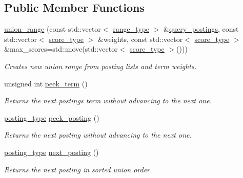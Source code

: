 \subsection*{Public Member Functions}
\begin{DoxyCompactItemize}
\item 
\mbox{\hyperlink{classirk_1_1union__range_a64113cb12f111b46248be984b3ca16c2}{union\+\_\+range}} (const std\+::vector$<$ \mbox{\hyperlink{classirk_1_1union__range_aae1621f1e73b1b78990ad11eaa52452b}{range\+\_\+type}} $>$ \&\mbox{\hyperlink{namespaceirk_af66b19416653b16808a23d66c715635a}{query\+\_\+postings}}, const std\+::vector$<$ \mbox{\hyperlink{classirk_1_1union__range_af728218b976df464ebb051a9e5358e93}{score\+\_\+type}} $>$ \&weights, const std\+::vector$<$ \mbox{\hyperlink{classirk_1_1union__range_af728218b976df464ebb051a9e5358e93}{score\+\_\+type}} $>$ \&max\+\_\+scores=std\+::move(std\+::vector$<$ \mbox{\hyperlink{classirk_1_1union__range_af728218b976df464ebb051a9e5358e93}{score\+\_\+type}} $>$()))
\begin{DoxyCompactList}\small\item\em Creates new union range from posting lists and term weights. \end{DoxyCompactList}\item 
unsigned int \mbox{\hyperlink{classirk_1_1union__range_a0b771d0ee6fb2ac3c04be8a2d2d47b33}{peek\+\_\+term}} ()
\begin{DoxyCompactList}\small\item\em Returns the next posting\textquotesingle{}s term without advancing to the next one. \end{DoxyCompactList}\item 
\mbox{\hyperlink{classirk_1_1union__range_ac125c83e17d473ee5480fef76cfe42f9}{posting\+\_\+type}} \mbox{\hyperlink{classirk_1_1union__range_a634d96d13219c2856a6bedf37cd8f1de}{peek\+\_\+posting}} ()
\begin{DoxyCompactList}\small\item\em Returns the next posting without advancing to the next one. \end{DoxyCompactList}\item 
\mbox{\hyperlink{classirk_1_1union__range_ac125c83e17d473ee5480fef76cfe42f9}{posting\+\_\+type}} \mbox{\hyperlink{classirk_1_1union__range_a3513c7a28c0e241a6f9ccfc5bf7b6e67}{next\+\_\+posting}} ()
\begin{DoxyCompactList}\small\item\em Returns the next posting in sorted union order. \end{DoxyCompactList}\item 

\end{DoxyCompactItemize}
